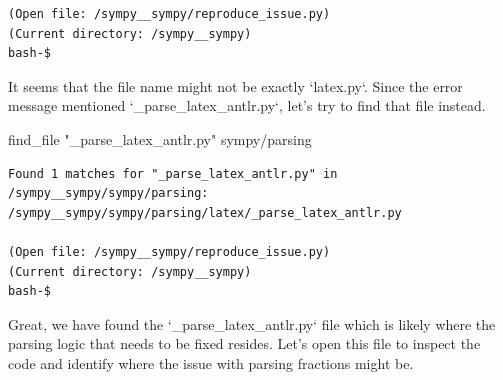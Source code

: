 {\begin{observationbox}
\begin{Verbatim}[breaklines=true, breakanywhere=true]
(Open file: /sympy__sympy/reproduce_issue.py)
(Current directory: /sympy__sympy)
bash-$
\end{Verbatim}
\end{observationbox}
\begin{agentbox}
It seems that the file name might not be exactly `latex.py`. Since the error message mentioned `\_parse\_latex\_antlr.py`, let's try to find that file instead.

\hrulefill
\begin{CodeVerbatim}[breaklines=true, breakanywhere=true]
find_file "_parse_latex_antlr.py" sympy/parsing
\end{CodeVerbatim}
\end{agentbox}
\begin{observationbox}\begin{Verbatim}[breaklines=true, breakanywhere=true]
Found 1 matches for "_parse_latex_antlr.py" in /sympy__sympy/sympy/parsing:
/sympy__sympy/sympy/parsing/latex/_parse_latex_antlr.py

(Open file: /sympy__sympy/reproduce_issue.py)
(Current directory: /sympy__sympy)
bash-$
\end{Verbatim}
\end{observationbox}
\begin{agentbox}
Great, we have found the `\_parse\_latex\_antlr.py` file which is likely where the parsing logic that needs to be fixed resides. Let's open this file to inspect the code and identify where the issue with parsing fractions might be.


\end{agentbox}}
